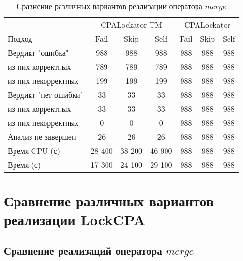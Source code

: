 \begin{center}
  \begin{table}[h]\footnotesize
  	\label{table-drivers-lock-merge}
    \caption{Сравнение различных вариантов реализации оператора $merge$}
    \begin{tabular}{ | l | c | c | c | c | c | c |}
      \hline
      		& 		\multicolumn{3}{|c|}{CPALockator-TM} 	& \multicolumn{3}{|c|}{CPALockator} \\
      Подход         				& Fail 	& Skip 	& Self 	& Fail 	& Skip 	& Self  \\ \hline
      Вердикт "ошибка" 				& 988   & 988   & 988   & 988   & 988   & 988   \\ 
  \hspace{0.5cm} из них корректных 	& 789 	& 789 	& 789   & 988   & 988   & 988   \\ 
  \hspace{0.5cm} из них некорректных & 199 	& 199 	& 199   & 988   & 988   & 988   \\ \hline
      Вердикт "нет ошибки"  		& 33    & 33    & 33    & 988   & 988  	& 988   \\ 
  \hspace{0.5cm} из них корректных & 33 	& 33    & 33    & 988   & 988   & 988   \\
  \hspace{0.5cm} из них некорректных & 0 	& 0    	& 0     & 988   & 988   & 988   \\ \hline
      Анализ не завершен       		& 26    & 26    & 26    & 988   & 988   & 988   \\ \hline
      Время CPU (с)   				& 28 400 & 38 200 & 46 900 & 988 & 988  & 988   \\ 
      Время (с)  					& 17 300 & 24 100 & 29 100 & 988 & 988 	& 988   \\
      \hline
    \end{tabular}
  \end{table}
\end{center}

\section{Сравнение различных вариантов реализации LockCPA}

\subsection{Сравнение реализаций оператора $merge$ }

